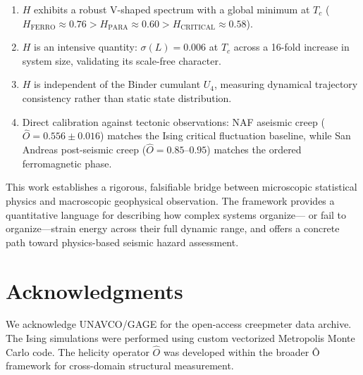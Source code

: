 \documentclass[aps,prl,twocolumn,superscriptaddress,byrevtex]{article}
\begin{document}
\begin{enumerate}
\item $H$ exhibits a robust V-shaped spectrum with a global minimum at $T_c$
      ($H_{\text{FERRO}} \approx 0.76 > H_{\text{PARA}} \approx 0.60 >
      H_{\text{CRITICAL}} \approx 0.58$).
\item $H$ is an intensive quantity: $\sigma(L) = 0.006$ at $T_c$ across a
      16-fold increase in system size, validating its scale-free character.
\item $H$ is independent of the Binder cumulant $U_4$, measuring dynamical
      trajectory consistency rather than static state distribution.
\item Direct calibration against tectonic observations: NAF aseismic creep
      ($\hat{O} = 0.556 \pm 0.016$) matches the Ising critical fluctuation
      baseline, while San Andreas post-seismic creep ($\hat{O} = 0.85$--$0.95$)
      matches the ordered ferromagnetic phase.
\end{enumerate}

This work establishes a rigorous, falsifiable bridge between microscopic
statistical physics and macroscopic geophysical observation. The framework
provides a quantitative language for describing how complex systems organize---
or fail to organize---strain energy across their full dynamic range, and offers
a concrete path toward physics-based seismic hazard assessment.

\section*{Acknowledgments}

We acknowledge UNAVCO/GAGE for the open-access creepmeter data archive. The
Ising simulations were performed using custom vectorized Metropolis Monte Carlo
code. The helicity operator $\hat{O}$ was developed within the broader Ô
framework for cross-domain structural measurement.
\end{document}

